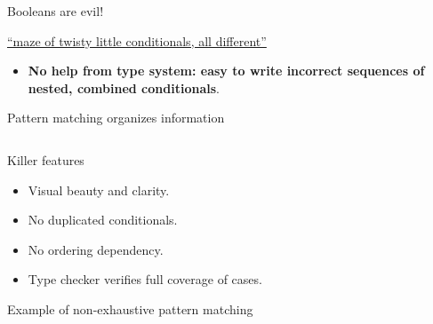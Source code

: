 \begin{frame}{Booleans are evil!}
  \begin{block}{\href{http://en.wikiquote.org/wiki/Colossal\_Cave\_Adventure}{``maze of twisty little conditionals, all different''}}
    \begin{itemize}
    \item \textbf{No help from type system: easy to write incorrect sequences of nested, combined conditionals}.
    \end{itemize}
  \end{block}
\end{frame}

\begin{frame}[fragile]{Pattern matching organizes information}
  \inputminted[gobble=2]{scala}{FizzBuzz2.scala}

  \begin{block}{Killer features}
    \begin{itemize}
    \item Visual \alert{beauty} and clarity.
    \item No duplicated conditionals.
    \item No ordering dependency.
    \item \alert{Type checker} verifies \alert{full coverage} of cases.
    \end{itemize}
  \end{block}
\end{frame}

\begin{frame}[fragile]{Example of non-exhaustive pattern matching}
  \inputminted[gobble=2]{scala}{FizzBuzz2Bad.scala}

  \inputminted{console}{testQuick4.console}
\end{frame}

